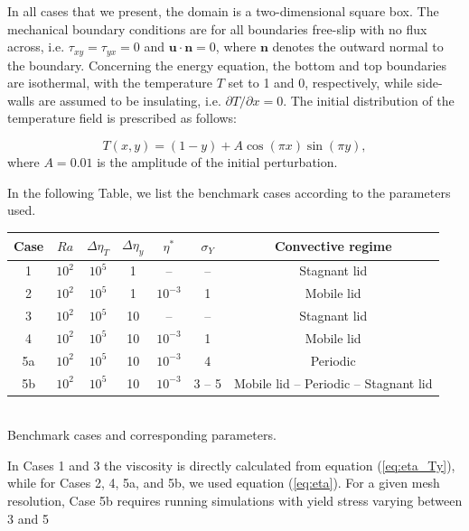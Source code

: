 In all cases that we present, the domain is a two-dimensional square box. The mechanical 
boundary conditions are for all boundaries free-slip 
with no flux across, i.e. $\tau_{xy}=\tau_{yx}=0$ and $\boldsymbol{u}\cdot \boldsymbol{n}=0$, 
where $\boldsymbol{n}$ denotes the outward normal to 
the boundary. Concerning the energy equation, the bottom and top boundaries are isothermal, 
with the temperature $T$ set to 1 and 0, respectively, 
while side-walls are assumed to be insulating, i.e. $\partial T/\partial x = 0$. 
The initial distribution of the temperature field is prescribed as follows:

\begin{equation}
T(x,y) = (1-y) + A \cos(\pi x)\sin(\pi y), \label{eq:initemp}
\end{equation}
where $A=0.01$ is the amplitude of the initial perturbation.


In the following Table, we list the benchmark cases according to the parameters used. 
\begin{center}
\begin{tabular}{c c c c c c c} 
\hline
Case & $Ra$ & $\Delta\eta_T$ & $\Delta\eta_y$ & $\eta^*$ & $\sigma_Y$ & Convective regime \\
\hline
1   & $10^2$ & $10^5$    & 1  & -- & --             & Stagnant lid    \\
2   & $10^2$ & $10^5$    & 1  & $10^{-3}$ & 1       & Mobile lid \\
3   & $10^2$ & $10^5$    & 10 & --  & --            & Stagnant lid \\
4   & $10^2$ & $10^5$    & 10 & $10^{-3}$ & 1       & Mobile lid  \\
5a  & $10^2$ & $10^5$    & 10 & $10^{-3}$ & 4       & Periodic  \\
5b  & $10^2$ & $10^5$    & 10 & $10^{-3}$ & 3 -- 5  & Mobile lid -- Periodic -- Stagnant lid \\
\hline
\end{tabular}\\
{\small Benchmark cases and corresponding parameters.} 
\end{center}

In Cases 1 and 3 the viscosity is directly calculated from equation (\ref{eq:eta_Ty}), 
while for Cases 2, 4, 5a, and 5b, we used equation (\ref{eq:eta}). For a given mesh resolution, 
Case 5b requires running simulations with yield stress varying between 3 and 5


